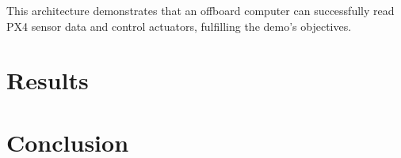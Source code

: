 \documentclass[a4paper]{article}
\begin{document}
This architecture demonstrates that an offboard computer can successfully read PX4 sensor data and control actuators, fulfilling the demo's objectives.

\section{Results}




\section{Conclusion}


\end{document}
